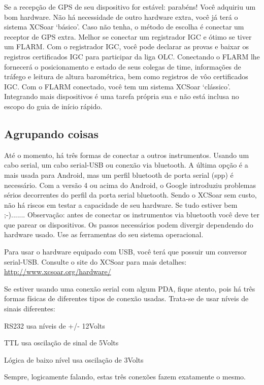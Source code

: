 \documentclass[a4paper,12pt]{refrep}
\begin{document}
Se a recepção de GPS de seu dispositivo for estável: parabéns!  Você adquiriu um bom hardware.  Não há necessidade de outro hardware extra, você já terá o sistema XCSoar ‘básico’.  Caso não tenha, o método de escolha é conectar um receptor de GPS extra.  Melhor se conectar um registrador IGC e ótimo se tiver um FLARM.  Com o registrador IGC, você pode declarar as provas e baixar os registros certificados IGC para participar da liga OLC.  Conectando o FLARM lhe fornecerá o posicionamento e estado de seus colegas de time, informações de tráfego e leitura de altura barométrica, bem como registros de vôo certificados IGC.  Com o FLARM conectado, você tem um sistema XCSoar ‘clássico’.  Integrando mais dispositivos é uma tarefa própria sua e não está inclusa no escopo do guia de início rápido.

\subsection{\textcolor{flashblue}{Agrupando coisas}}
Até o momento, há três formas de conectar a outros instrumentos.  Usando um cabo serial, um cabo serial-USB ou conexão via bluetooth.  A última opção é a mais usada para Android, mas um perfil bluetooth de porta serial (spp) é necessário.  Com a versão 4 ou acima do Android, o Google introduziu problemas sérios decorrentes do perfil da porta serial bluetooth.  Sendo o XCSoar sem custo, não há riscos em testar a capacidade de seu hardware.  Se tudo estiver bem ;-).......
Observação: antes de conectar os instrumentos via bluetooth você deve ter que parear os dispositivos.  Os passos necessários podem divergir dependendo do hardware usado.  Use as ferramentas do seu sistema operacional.

Para usar o hardware equipado com USB, você terá que possuir um conversor serial-USB.  Consulte o site do XCSoar para mais detalhes: {\url{http://www.xcsoar.org/hardware/}}

Se estiver usando uma conexão serial com algum PDA, fique atento, pois há três formas físicas de diferentes tipos de conexão usadas.  Trata-se de usar níveis de sinais diferentes:

\begin{compactitem}
\item RS232 usa níveis de +/- 12Volts
\item TTL usa oscilação de sinal de 5Volts
\item Lógica de baixo nível usa oscilação de 3Volts
\end{compactitem}
Sempre, logicamente falando, estas três conexões fazem exatamente o mesmo. 
\end{document}
